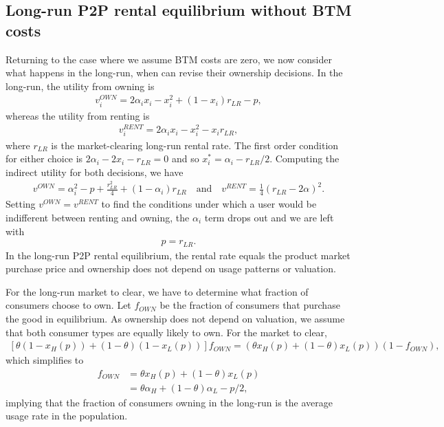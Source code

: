 \documentclass[11pt]{article}
\begin{document}
\subsection{Long-run P2P rental equilibrium without BTM costs} 
Returning to the case where we assume BTM costs are zero, we now consider what happens in the long-run, when can revise their ownership decisions. 
In the long-run, the utility from owning is 
\begin{align}
v^{OWN}_i = 2\alpha_i x_i - x_i^2 + (1-x_i)r_{LR} - p,   
\end{align} 
whereas the utility from renting is 
\begin{align}
v^{RENT}_{i} = 2\alpha_i x_i - x_i^2 - x_i r_{LR}, 
\end{align} 
where $r_{LR}$ is the market-clearing long-run rental rate. 
The first order condition for either choice is $2 \alpha_i - 2 x_i - r_{LR} = 0$ and so $x^*_i = \alpha_i - r_{LR}/2$. 
Computing the indirect utility for both decisions, we have
\begin{align} 
v^{OWN} = \alpha_i^2 - p + \frac{r_{LR}^2}{4} + (1 - \alpha_i) r_{LR} \quad  \mbox{and} \quad v^{RENT} = \frac{1}{4} (r_{LR}- 2\alpha )^2. 
\end{align} 
Setting $v^{OWN} = v^{RENT}$ to find the conditions under which a user would be indifferent between renting and owning, the $\alpha_i$ term drops out and we are left with 
\begin{align} \label{eq:lr_eq_r}
p = r_{LR}. 
\end{align}
In the long-run P2P rental equilibrium, the rental rate equals the product market purchase price and ownership does not depend on usage patterns or valuation.  

For the long-run market to clear, we have to determine what fraction of consumers choose to own. 
Let $f_{OWN}$ be the fraction of consumers that purchase the good in equilibrium. 
As ownership does not depend on valuation, we assume that both consumer types are equally likely to own. 
For the market to clear, 
\begin{align}
\left[ \theta (1-x_H(p)) + (1-\theta)(1-x_L(p))\right]f_{OWN} = \left(\theta x_H(p) + (1-\theta)x_L(p) \right)(1- f_{OWN}), 
\end{align} 
which simplifies to 
\begin{align}
  f_{OWN} &= \theta x_H(p) + (1-\theta)x_L(p) \\
         &= \theta \alpha_H + (1 - \theta) \alpha_L- p/2,
\end{align} 
implying that the fraction of consumers owning in the long-run is the average usage rate in the population.  
\end{document}
